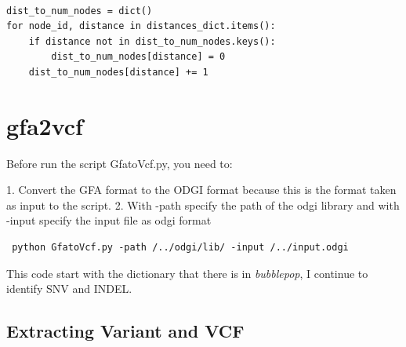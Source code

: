 \begin{verbatim}
    
dist_to_num_nodes = dict()   
for node_id, distance in distances_dict.items():
    if distance not in dist_to_num_nodes.keys():   
        dist_to_num_nodes[distance] = 0
    dist_to_num_nodes[distance] += 1

\end{verbatim}

\section{gfa2vcf}

Before run the script GfatoVcf.py, you need to:

1. Convert the GFA format to the ODGI format because this is the format taken as input to the script.
2. With -path specify the path of the odgi library and with -input specify the input file as odgi format

\begin{verbatim}
 python GfatoVcf.py -path /../odgi/lib/ -input /../input.odgi   
\end{verbatim}
    
This code start with the dictionary that there is in \textit{bubblepop}, I continue to identify SNV and INDEL.
\subsection{Extracting Variant and VCF}

